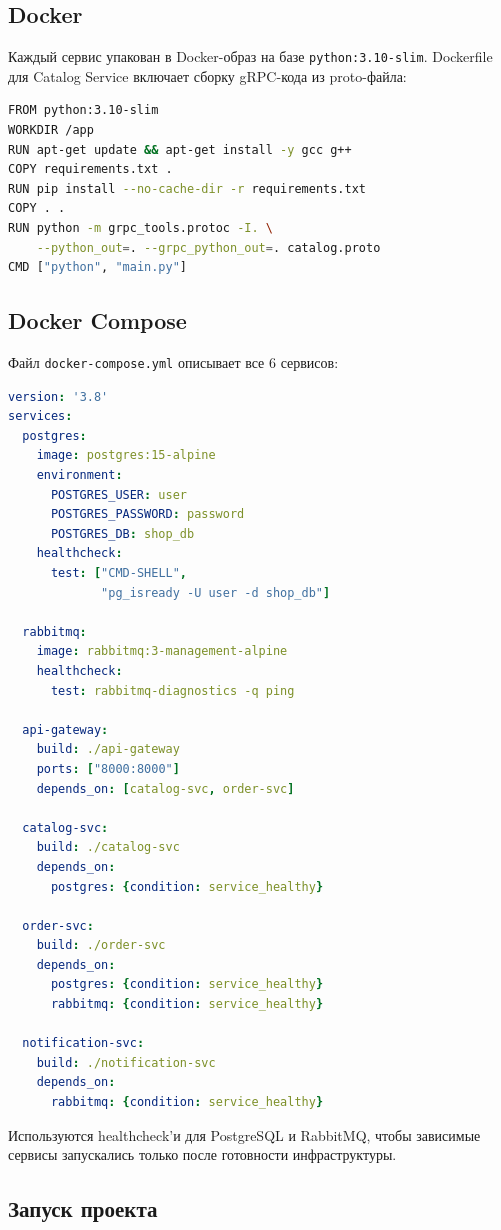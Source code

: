 \documentclass[14pt]{article}
\begin{document}
\subsection{Docker}

Каждый сервис упакован в Docker-образ на базе \texttt{python:3.10-slim}. Dockerfile для Catalog Service включает сборку gRPC-кода из proto-файла:

\begin{lstlisting}[language=bash]
FROM python:3.10-slim
WORKDIR /app
RUN apt-get update && apt-get install -y gcc g++
COPY requirements.txt .
RUN pip install --no-cache-dir -r requirements.txt
COPY . .
RUN python -m grpc_tools.protoc -I. \
    --python_out=. --grpc_python_out=. catalog.proto
CMD ["python", "main.py"]
\end{lstlisting}

\subsection{Docker Compose}

Файл \texttt{docker-compose.yml} описывает все 6 сервисов:

\begin{lstlisting}[language=yaml]
version: '3.8'
services:
  postgres:
    image: postgres:15-alpine
    environment:
      POSTGRES_USER: user
      POSTGRES_PASSWORD: password
      POSTGRES_DB: shop_db
    healthcheck:
      test: ["CMD-SHELL",
             "pg_isready -U user -d shop_db"]

  rabbitmq:
    image: rabbitmq:3-management-alpine
    healthcheck:
      test: rabbitmq-diagnostics -q ping

  api-gateway:
    build: ./api-gateway
    ports: ["8000:8000"]
    depends_on: [catalog-svc, order-svc]

  catalog-svc:
    build: ./catalog-svc
    depends_on:
      postgres: {condition: service_healthy}

  order-svc:
    build: ./order-svc
    depends_on:
      postgres: {condition: service_healthy}
      rabbitmq: {condition: service_healthy}

  notification-svc:
    build: ./notification-svc
    depends_on:
      rabbitmq: {condition: service_healthy}
\end{lstlisting}

Используются healthcheck'и для PostgreSQL и RabbitMQ, чтобы зависимые сервисы запускались только после готовности инфраструктуры.

\subsection{Запуск проекта}
\end{document}
